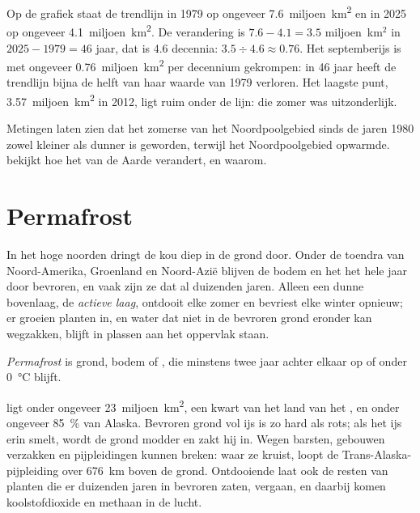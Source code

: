 \begin{example}
Op de grafiek staat de trendlijn in 1979 op ongeveer
\num{7.6}~miljoen~\unit{km^2} en in 2025 op ongeveer
\num{4.1}~miljoen~\unit{km^2}. De verandering is $7.6 - 4.1 =
3.5$ miljoen~km$^2$ in $2025 - 1979 = 46$ jaar, dat is 4.6 decennia:
$3.5 \div 4.6 \approx 0.76$. Het septemberijs is met ongeveer
\num{0.76}~miljoen~\unit{km^2} per decennium gekrompen: in 46 jaar heeft
de trendlijn bijna de helft van haar waarde van 1979 verloren. Het
laagste punt, \num{3.57}~miljoen~\unit{km^2} in 2012, ligt ruim onder de
lijn: die zomer was uitzonderlijk.
\end{example}

Metingen laten zien dat het zomerse  van het Noordpoolgebied sinds
de jaren 1980 zowel kleiner als dunner is geworden, terwijl het
Noordpoolgebied opwarmde.  bekijkt
hoe het  van de Aarde verandert, en waarom.

\section{Permafrost}

In het hoge noorden dringt de kou diep in de grond door. Onder de toendra
van Noord-Amerika, Groenland en Noord-Azië blijven de bodem en het
 het hele jaar door bevroren, en vaak zijn ze dat al duizenden
jaren. Alleen een dunne bovenlaag, de \emph{actieve laag}, ontdooit elke
zomer en bevriest elke winter opnieuw; er groeien planten in, en water dat
niet in de bevroren grond eronder kan wegzakken, blijft in plassen aan het
oppervlak staan.

\begin{definition}[Permafrost]\label{def:g8:ice-on-earth:permafrost}
\emph{Permafrost} is grond, bodem of , die
minstens twee jaar achter elkaar op of onder \qty{0}{\degreeCelsius}
blijft.
\end{definition}

 ligt onder ongeveer \num{23}~miljoen~\unit{km^2}, een kwart van
het land van het , en onder ongeveer 85~\% van Alaska.
Bevroren grond vol ijs is zo hard als rots; als het ijs erin smelt, wordt
de grond modder en zakt hij in. Wegen barsten, gebouwen verzakken en
pijpleidingen kunnen breken: waar ze  kruist, loopt de
Trans-Alaska-pijpleiding over \qty{676}{km} boven de grond. Ontdooiende
 laat ook de resten van planten die er duizenden jaren in
bevroren zaten, vergaan, en daarbij komen koolstofdioxide en methaan in de
lucht.

